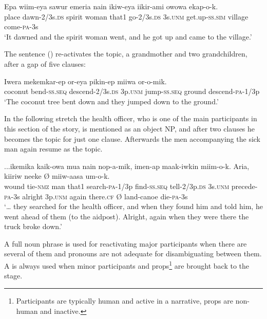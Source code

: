 \ea%
\label{ex:x1921}
\gll Epa  wiim-eya  sawur  emeria  nain  ikiw-eya   iikir-ami  owowa  ekap-o-k. \\
place  dawn-2/3s.\textsc{ds}  spirit  woman  that1  go-2/3s.\textsc{ds} 3s.\textsc{unm}  get.up-\textsc{ss}.\textsc{sim}  village  come-\textsc{pa}-3s     \\
\glt`It dawned and the spirit woman went, and he got up and came to the village.'
\z


The sentence () re-activates the topic, a grandmother and two grandchildren, after a gap of five clauses:

\ea%
\label{ex:x1923}
\gll Iwera  mekemkar-ep  or-eya    pikin-ep miiwa  or-o-mik. \\
coconut  bend-\textsc{ss}.\textsc{seq}  descend-2/3s.\textsc{ds}  3p.\textsc{unm}  jump-\textsc{ss}.\textsc{seq} ground  descend-\textsc{pa}-1/3p     \\
\glt`The coconut tree bent down and they jumped down to the ground.'
\z


In the following stretch the health officer, who is one of the main participants in this section of the story, is mentioned as an object NP, and after two clauses he becomes the topic for just one clause. Afterwards the men accompanying the sick man again resume as the topic. 

\ea%
\label{ex:x1924}
\gll ...ikemika  kaik-owa  mua  nain  nop-a-mik,  imen-ap maak-iwkin    miim-o-k.  Aria,    kiiriw  neeke {\O}  miiw-aasa  um-o-k.\\
wound  tie-\textsc{nmz}  man  that1  search-\textsc{pa}-1/3p  find-\textsc{ss}.\textsc{seq} tell-2/3p.\textsc{ds}  3s.\textsc{unm}  precede-\textsc{pa}-3s  alright  3p.\textsc{unm}  again  there.\textsc{cf} {\O}  land-canoe  die-\textsc{pa}-3s\\
\glt`{\dots} they searched for the health officer, and when they found him and told him, he went ahead of them (to the aidpost). Alright, again when they were there the truck broke down.'
\z


A full noun phrase is used for reactivating major participants when there are several of them and pronouns are not adequate for disambiguating between them. A  is always used when minor participants and props\footnote{Participants are typically human and active in a narrative, props are non-human and inactive. }  are brought back to the stage. 

